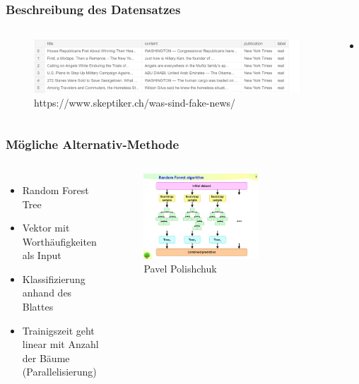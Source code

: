 \documentclass[aspectratio=1610, professionalfonts, 9pt]{beamer}
\begin{document}
  \begin{frame}
    \frametitle{Beschreibung des Datensatzes}
    \begin{columns}
      \begin{figure}
          \includegraphics[width=\textwidth]{pictures/fake.PNG}
          \caption{https://www.skeptiker.ch/was-sind-fake-news/}
          \label{}
      \end{figure}
      \begin{itemize}
      \item 
      \end{itemize}
    \end{columns}
  \end{frame}

  \begin{frame}
    \frametitle{Mögliche Alternativ-Methode}
    \begin{columns}
    \begin{itemize}
      \item Random Forest Tree
      \item Vektor mit Worthäufigkeiten als Input
      \item Klassifizierung anhand des Blattes
      \item Trainigszeit geht linear mit Anzahl der Bäume (Parallelisierung)
    \end{itemize}

    \begin{figure}
          \includegraphics[width=0.6\textwidth]{pictures/RF.jpg}
          \caption{Pavel Polishchuk}
          \label{}
      \end{figure}
    \end{columns}
    \end{frame}
\end{document}
